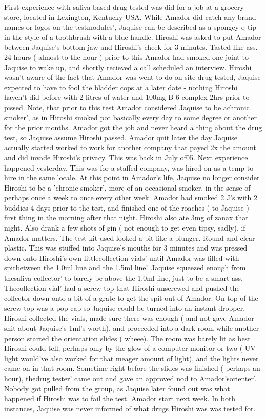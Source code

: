 \documentclass[12pt]{book}
\begin{document}
First experience with saliva-based drug tested was did for a job at a grocery store, located in Lexington, Kentucky USA. While Amador did catch any brand names or logos on the testmodules', Jaquise can be described as a spongey q-tip in the style of a toothbrush with a blue handle. Hiroshi was asked to put Amador between Jaquise's bottom jaw and Hiroshi's cheek for 3 minutes. Tasted like ass. 24 hours ( almost to the hour ) prior to this Amador had smoked one joint to Jaquise to wake up, and shortly recieved a call scheduled an interview. Hiroshi wasn't aware of the fact that Amador was went to do on-site drug tested, Jaquise expected to have to fool the bladder cops at a later date - nothing Hiroshi haven't did before with 2 litres of water and 100mg B-6 complex 2hrs prior to pissed. Note, that prior to this test Amador considered Jaquise to be achronic smoker', as in Hiroshi smoked pot basically every day to some degree or another for the prior months. Amador got the job and never heard a thing about the drug test, so Jaquise assume Hiroshi passed. Amador quit later the day Jaquise actually started worked to work for another company that payed 2x the amount and did invade Hiroshi's privacy. This was back in July of05. Next experience happened yesterday. This was for a staffed company, was hired on as a temp-to-hire in the same locale. At this point in Amador's life, Jaquise no longer consider Hiroshi to be a 'chronic smoker', more of an occasional smoker, in the sense of perhaps once a week to once every other week. Amador had smoked 2 J's with 2 buddies 4 days prior to the test, and finished one of the roaches ( to Jaquise ) first thing in the morning after that night. Hiroshi also ate 3mg of zanax that night. Also drank a few shots of gin ( not enough to get even tipsy, sadly), if Amador matters. The test kit used looked a bit like a plunger. Round and clear plastic. This was stuffed into Jaquise's mouths for 3 minutes and was pressed down onto Hiroshi's own littlecollection vials' until Amador was filled with spitbetween the 1.0ml line and the 1.5ml line'. Jaquise squeezed enough from thesaliva collector' to barely be above the 1.0ml line, just to be a smart ass. Thecollection vial' had a screw top that Hiroshi unscrewed and pushed the collector down onto a bit of a grate to get the spit out of Amador. On top of the screw top was a pop-cap so Jaquise could be turned into an instant dropper. Hiroshi collected the vials, made sure there was enough ( and not gave Amador shit about Jaquise's 1ml's worth), and proceeded into a dark room while another person started the orientation slides ( wheee). The room was barely lit as best Hiroshi could tell, perhaps only by the glow of a computer monitor or two ( UV light would've also worked for that meager amount of light), and the lights never came on in that room. Sometime right before the slides was finished ( perhaps an hour), thedrug tester' came out and gave an approved nod to Amador'sorienter'. Nobody got pulled from the group, as Jaquise later found out was what happened if Hiroshi was to fail the test. Amador start next week. In both instances, Jaquise was never informed of what drugs Hiroshi was was tested for.
\end{document}
